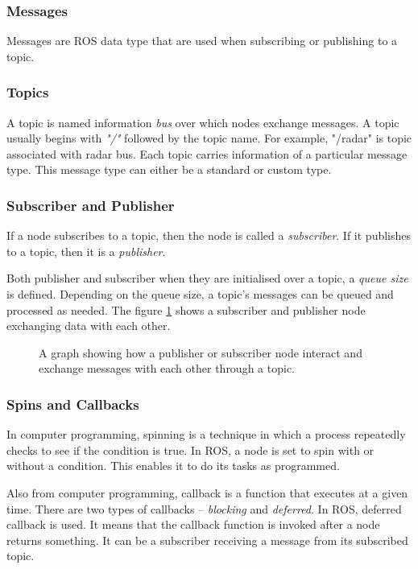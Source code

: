 \subsubsection*{Messages}
Messages are ROS data type that are used when subscribing or publishing to a topic.
\subsubsection*{Topics}
A topic is named information \textit{bus} over which nodes exchange messages.
A topic usually begins with \textit{"/"} followed by the topic name. For example, "/radar"
is topic associated with radar bus. Each topic carries information of a particular message
type. This message type can either be a standard or custom type.
\subsubsection*{Subscriber and Publisher}
If a node subscribes to a topic, then the node is called a \textit{subscriber}. If it
publishes to a topic, then it is a \textit{publisher}.

Both publisher and subscriber when they are initialised over a topic, a \textit{queue
size} is defined. Depending on the queue size, a topic's messages can be queued and
processed as needed. The figure \ref{fig:rosgraph} shows a subscriber and publisher node
exchanging data with each other.

\begin{figure}[h]
    \centering
    \def\svgwidth{0.9\textwidth}
    
    \caption{A graph showing how a publisher or subscriber node interact and exchange
    messages with each other through a topic.}
    \label{fig:rosgraph}
\end{figure}

\subsubsection*{Spins and Callbacks}
In computer programming, spinning is a technique in which a process repeatedly checks to
see if the condition is true. In ROS, a node is set to spin with or without a condition. This
enables it to do its tasks as programmed.

Also from computer programming, callback is a function that executes at a given time.
There are two types of callbacks -- \textit{blocking} and \textit{deferred}. In ROS,
deferred callback is used. It means that the callback function is invoked after a node
returns something. It can be a subscriber receiving a message from its subscribed topic.

